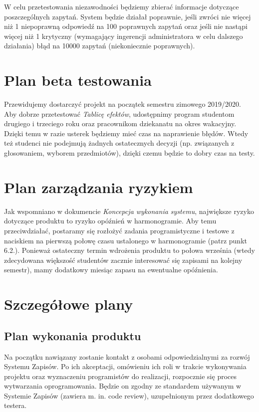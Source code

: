 \documentclass{article}
\begin{document}
W celu przetestowania niezawodności będziemy zbierać informacje dotyczące poszczególnych zapytań.
System będzie działał poprawnie, jeśli zwróci nie więcej niż 1 niepoprawną odpowiedź na 100 poprawnych zapytań oraz jeśli nie nastąpi więcej niż 1 krytyczny (wymagający ingerencji administratora w celu dalszego działania) błąd na 10000 zapytań (niekoniecznie poprawnych).

\section{Plan beta testowania}
Przewidujemy dostarczyć projekt na początek semestru zimowego 2019/2020.
Aby dobrze przetestować \textit{Tablicę efektów}, udostępnimy program studentom drugiego i trzeciego roku oraz pracownikom dziekanatu na okres wakacyjny.
Dzięki temu w razie usterek będziemy mieć czas na naprawienie błędów. Wtedy też studenci nie podejmują żadnych ostatecznych decyzji (np. związanych z głosowaniem, wyborem przedmiotów), dzięki czemu będzie to dobry czas na testy.

\section{Plan zarządzania ryzykiem}
Jak wspomniano w dokumencie \textit{Koncepcja wykonania systemu}, największe ryzyko dotyczące produktu to ryzyko opóźnień w harmonogramie.
Aby temu przeciwdziałać, postaramy się rozłożyć zadania programistyczne i testowe z naciskiem na pierwszą połowę czasu ustalonego w harmonogramie (patrz punkt 6.2.).
Ponieważ ostateczny termin wdrożenia produktu to połowa września (wtedy zdecydowana większość studentów zacznie interesować się zapisami na kolejny semestr), mamy dodatkowy miesiąc zapasu na ewentualne opóźnienia.

\section{Szczegółowe plany}
\subsection{Plan wykonania produktu}
Na początku nawiązany zostanie kontakt z osobami odpowiedzialnymi za rozwój Systemu Zapisów.
Po ich akceptacji, omówieniu ich roli w trakcie wykonywania projektu oraz wyznaczeniu programistów do realizacji, rozpocznie się proces wytwarzania oprogramowania.
Będzie on zgodny ze standardem używanym w Systemie Zapisów (zawiera m. in. code review), uzupełnionym przez dodatkowego testera.
\end{document}
